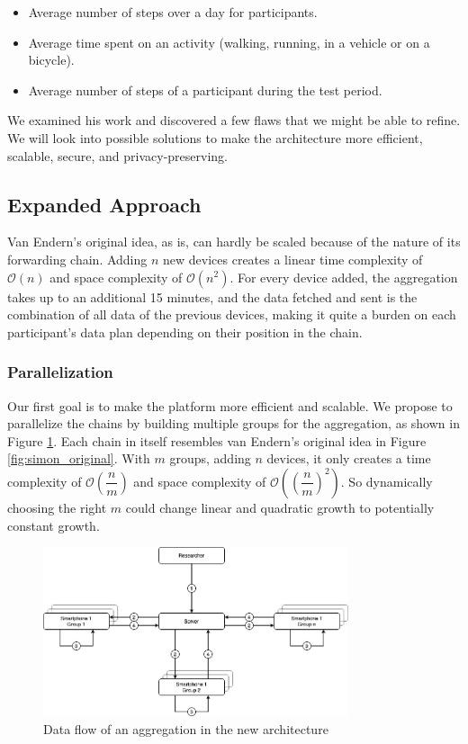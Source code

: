 \begin{itemize}
    \item Average number of steps over a day for participants. 
    \item Average time spent on an activity (walking, running, in a vehicle or on a bicycle).
    \item Average number of steps of a participant during the test period. 
\end{itemize}

We examined his work and discovered a few flaws that we might be able to refine. We will look into possible solutions to make the architecture more efficient, scalable, secure, and privacy-preserving.

\subsection{Expanded Approach}
Van Endern's original idea, as is, can hardly be scaled because of the nature of its forwarding chain. Adding \(n\) new devices creates a linear time complexity of \(\mathcal{O}(n)\) and space complexity of \(\mathcal{O}(n^2)\). For every device added, the aggregation takes up to an additional 15 minutes, and the data fetched and sent is the combination of all data of the previous devices, making it quite a burden on each participant's data plan depending on their position in the chain.

\subsubsection{Parallelization}
Our first goal is to make the platform more efficient and scalable. We propose to parallelize the chains by building multiple groups for the aggregation, as shown in Figure \ref{fig:ar}. Each chain in itself resembles van Endern's original idea in Figure \ref{fig:simon_original}. With \(m\) groups, adding \(n\) devices, it only creates a time complexity of \(\mathcal{O}(\dfrac{n}{m})\) and space complexity of \(\mathcal{O}((\dfrac{n}{m})^2)\). So dynamically choosing the right \(m\) could change linear and quadratic growth to potentially constant growth. 

\begin{figure}[htbp]
  \centering
  \includegraphics[width=0.8\textwidth]{figures/ar}
  \caption{Data flow of an aggregation in the new architecture} \label{fig:ar}
\end{figure}

